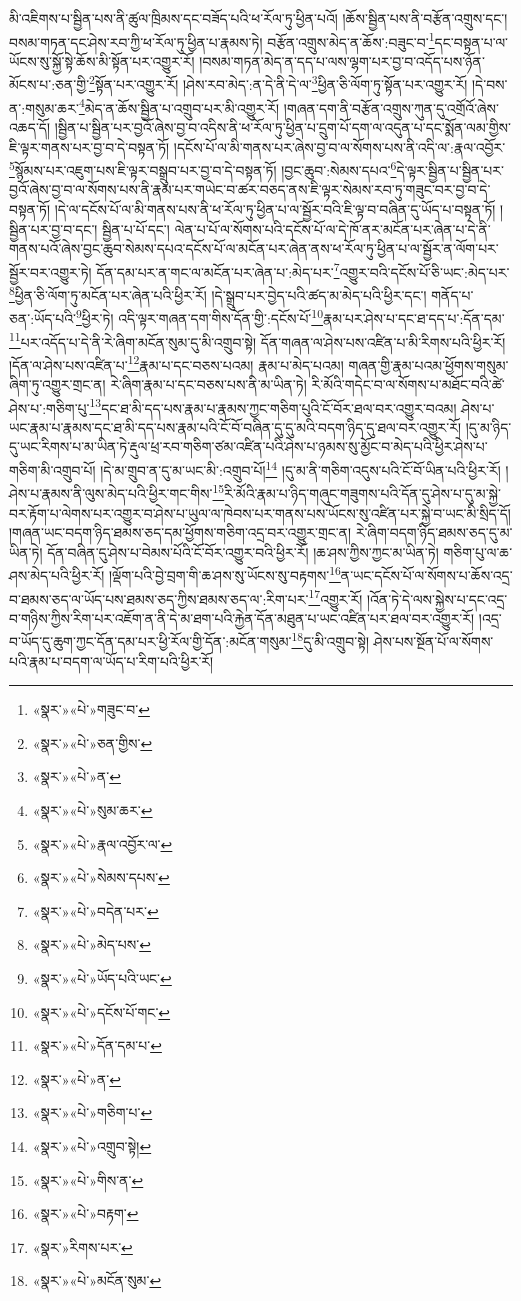 མི་འཇིགས་པ་སྦྱིན་པས་ནི་ཚུལ་ཁྲིམས་དང་བཟོད་པའི་ཕ་རོལ་ཏུ་ཕྱིན་པའོ། །ཆོས་སྦྱིན་པས་ནི་བརྩོན་འགྲུས་དང་། བསམ་གཏན་དང་ཤེས་རབ་ཀྱི་ཕ་རོལ་ཏུ་ཕྱིན་པ་རྣམས་ཏེ། བརྩོན་འགྲུས་མེད་ན་ཆོས་:བཟུང་བ་\footnote{«སྣར་»«པེ་»གཟུང་བ་}དང་བསྟན་པ་ལ་ཡོངས་སུ་སྐྱོ་སྟེ་ཆོས་མི་སྟོན་པར་འགྱུར་རོ། །བསམ་གཏན་མེད་ན་དད་པ་ལས་ལྷག་པར་བྱ་བ་འདོད་པས་ཉོན་མོངས་པ་:ཅན་གྱི་\footnote{«སྣར་»«པེ་»ཅན་གྱིས་}སྟོན་པར་འགྱུར་རོ། །ཤེས་རབ་མེད་:ན་དེ་ནི་དེ་ལ་\footnote{«སྣར་»«པེ་»ན་}ཕྱིན་ཅི་ལོག་ཏུ་སྟོན་པར་འགྱུར་རོ། །དེ་བས་ན་:གསུམ་ཆར་\footnote{«སྣར་»«པེ་»སུམ་ཆར་}མེད་ན་ཆོས་སྦྱིན་པ་འགྲུབ་པར་མི་འགྱུར་རོ། །གཞན་དག་ནི་བརྩོན་འགྲུས་ཀུན་དུ་འགྲོའོ་ཞེས་འཆད་དོ། །སྦྱིན་པ་སྦྱིན་པར་བྱའོ་ཞེས་བྱ་བ་འདིས་ནི་ཕ་རོལ་ཏུ་ཕྱིན་པ་དྲུག་པོ་དག་ལ་འདུན་པ་དང་སྨོན་ལམ་གྱིས་ཇི་ལྟར་གནས་པར་བྱ་བ་དེ་བསྟན་ཏོ། །དངོས་པོ་ལ་མི་གནས་པར་ཞེས་བྱ་བ་ལ་སོགས་པས་ནི་འདི་ལ་:རྣལ་འབྱོར་\footnote{«སྣར་»«པེ་»རྣལ་འབྱོར་ལ་}སྙོམས་པར་འཇུག་པས་ཇི་ལྟར་བསྒྲུབ་པར་བྱ་བ་དེ་བསྟན་ཏོ། །བྱང་ཆུབ་:སེམས་དཔའ་\footnote{«སྣར་»«པེ་»སེམས་དཔས་}དེ་ལྟར་སྦྱིན་པ་སྦྱིན་པར་བྱའོ་ཞེས་བྱ་བ་ལ་སོགས་པས་ནི་རྣམ་པར་གཡེང་བ་ཚར་བཅད་ནས་ཇི་ལྟར་སེམས་རབ་ཏུ་གཟུང་བར་བྱ་བ་དེ་བསྟན་ཏོ། །དེ་ལ་དངོས་པོ་ལ་མི་གནས་པས་ནི་ཕ་རོལ་ཏུ་ཕྱིན་པ་ལ་སྦྱོར་བའི་ཇི་ལྟ་བ་བཞིན་དུ་ཡོད་པ་བསྟན་ཏོ། །སྦྱིན་པར་བྱ་བ་དང་། སྦྱིན་པ་པོ་དང་། ལེན་པ་པོ་ལ་སོགས་པའི་དངོས་པོ་ལ་དེ་ཁོ་ནར་མངོན་པར་ཞེན་པ་དེ་ནི་གནས་པའོ་ཞེས་བྱང་ཆུབ་སེམས་དཔའ་དངོས་པོ་ལ་མངོན་པར་ཞེན་ནས་ཕ་རོལ་ཏུ་ཕྱིན་པ་ལ་སྦྱོར་ན་ལོག་པར་སྦྱོར་བར་འགྱུར་ཏེ། དོན་དམ་པར་ན་གང་ལ་མངོན་པར་ཞེན་པ་:མེད་པར་\footnote{«སྣར་»«པེ་»བདེན་པར་}འགྱུར་བའི་དངོས་པོ་ཅི་ཡང་:མེད་པར་\footnote{«སྣར་»«པེ་»མེད་པས་}ཕྱིན་ཅི་ལོག་ཏུ་མངོན་པར་ཞེན་པའི་ཕྱིར་རོ། །དེ་སྒྲུབ་པར་བྱེད་པའི་ཚད་མ་མེད་པའི་ཕྱིར་དང་། གནོད་པ་ཅན་:ཡོད་པའི་\footnote{«སྣར་»«པེ་»ཡོད་པའི་ཡང་}ཕྱིར་ཏེ། འདི་ལྟར་གཞན་དག་གིས་དོན་གྱི་:དངོས་པོ་\footnote{«སྣར་»«པེ་»དངོས་པོ་གང་}རྣམ་པར་ཤེས་པ་དང་ཐ་དད་པ་:དོན་དམ་\footnote{«སྣར་»«པེ་»དོན་དམ་པ་}པར་འདོད་པ་དེ་ནི་རེ་ཞིག་མངོན་སུམ་དུ་མི་འགྲུབ་སྟེ། དོན་གཞན་ལ་ཤེས་པས་འཛིན་པ་མི་རིགས་པའི་ཕྱིར་རོ། །དོན་ལ་ཤེས་པས་འཛིན་པ་\footnote{«སྣར་»«པེ་»ན་}རྣམ་པ་དང་བཅས་པའམ། རྣམ་པ་མེད་པའམ། གཞན་གྱི་རྣམ་པའམ་ཕྱོགས་གསུམ་ཞིག་ཏུ་འགྱུར་གྲང་ན། རེ་ཞིག་རྣམ་པ་དང་བཅས་པས་ནི་མ་ཡིན་ཏེ། རི་མོའི་གདེང་བ་ལ་སོགས་པ་མཐོང་བའི་ཚེ་ཤེས་པ་:གཅིག་པུ་\footnote{«སྣར་»«པེ་»གཅིག་པ་}དང་ཐ་མི་དད་པས་རྣམ་པ་རྣམས་ཀྱང་གཅིག་པུའི་ངོ་བོར་ཐལ་བར་འགྱུར་བའམ། ཤེས་པ་ཡང་རྣམ་པ་རྣམས་དང་ཐ་མི་དད་པས་རྣམ་པའི་ངོ་བོ་བཞིན་དུ་དུ་མའི་བདག་ཉིད་དུ་ཐལ་བར་འགྱུར་རོ། །དུ་མ་ཉིད་དུ་ཡང་རིགས་པ་མ་ཡིན་ཏེ་རྡུལ་ཕྲ་རབ་གཅིག་ཙམ་འཛིན་པའི་ཤེས་པ་ཉམས་སུ་མྱོང་བ་མེད་པའི་ཕྱིར་ཤེས་པ་གཅིག་མི་འགྲུབ་པོ། །དེ་མ་གྲུབ་ན་དུ་མ་ཡང་མི་:འགྲུབ་པོ།\footnote{«སྣར་»«པེ་»འགྲུབ་སྟེ།} །དུ་མ་ནི་གཅིག་འདུས་པའི་ངོ་བོ་ཡིན་པའི་ཕྱིར་རོ། །ཤེས་པ་རྣམས་ནི་ལུས་མེད་པའི་ཕྱིར་གང་གིས་\footnote{«སྣར་»«པེ་»གིས་ན་}རི་མོའི་རྣམ་པ་ཉིད་གཞུང་གཟུགས་པའི་དོན་དུ་ཤེས་པ་དུ་མ་སྐྱེ་བར་རྟོག་པ་ལེགས་པར་འགྱུར་བ་ཤེས་པ་ཡུལ་ལ་ཁེབས་པར་གནས་པས་ཡོངས་སུ་འཛིན་པར་སྐྱེ་བ་ཡང་མི་སྲིད་དོ། །གཞན་ཡང་བདག་ཉིད་ཐམས་ཅད་དམ་ཕྱོགས་གཅིག་འདྲ་བར་འགྱུར་གྲང་ན། རེ་ཞིག་བདག་ཉིད་ཐམས་ཅད་དུ་མ་ཡིན་ཏེ། དོན་བཞིན་དུ་ཤེས་པ་བེམས་པོའི་ངོ་བོར་འགྱུར་བའི་ཕྱིར་རོ། །ཆ་ཤས་ཀྱིས་ཀྱང་མ་ཡིན་ཏེ། གཅིག་པུ་ལ་ཆ་ཤས་མེད་པའི་ཕྱིར་རོ། །ལྡོག་པའི་བྱེ་བྲག་གི་ཆ་ཤས་སུ་ཡོངས་སུ་བརྟགས་\footnote{«སྣར་»«པེ་»བརྟག་}ན་ཡང་དངོས་པོ་ལ་སོགས་པ་ཆོས་འདྲ་བ་ཐམས་ཅད་ལ་ཡོད་པས་ཐམས་ཅད་ཀྱིས་ཐམས་ཅད་ལ་:རིག་པར་\footnote{«སྣར་»རིགས་པར་}འགྱུར་རོ། །འོན་ཏེ་དེ་ལས་སྐྱེས་པ་དང་འདྲ་བ་གཉིས་ཀྱིས་རིག་པར་འཇོག་ན་ནི་དེ་མ་ཐག་པའི་རྐྱེན་དོན་མཐུན་པ་ཡང་འཛིན་པར་ཐལ་བར་འགྱུར་རོ། །འདྲ་བ་ཡོད་དུ་ཆུག་ཀྱང་དོན་དམ་པར་ཕྱི་རོལ་གྱི་དོན་:མངོན་གསུམ་\footnote{«སྣར་»«པེ་»མངོན་སུམ་}དུ་མི་འགྲུབ་སྟེ། ཤེས་པས་སྔོན་པོ་ལ་སོགས་པའི་རྣམ་པ་བདག་ལ་ཡོད་པ་རིག་པའི་ཕྱིར་རོ། 